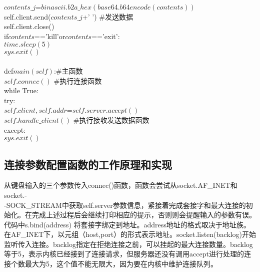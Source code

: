\begin{breakablealgorithm}
\begin{algorithmic}[1]
			\qquad \qquad $contents\_j$=$binascii.b2a\_hex(base64.b64encode(contents)) $\\			\qquad \qquad self.client.send($contents\_j$+' ') \qquad \#发送数据\\
			\qquad \qquad self.client.close()\\

			\qquad \qquad if\quad  $contents$=='kill'\quad  or\quad  $contents$=='exit':\\
				\qquad \qquad \qquad $time.sleep(5)$\\
				\qquad \qquad \qquad $sys.exit()$\\
\\
\qquad def\quad  $main(self)$:\qquad \#主函数\\
		\qquad \quad  $self.connec()$ \qquad \#执行连接函数\\
		\qquad \quad  while True:\\

			\qquad \qquad  try:\\
			\qquad \qquad \qquad $self.client,self.addr$=$self.server.accept()$\\
			\qquad \qquad \qquad $self.handle\_client()$   \qquad \#执行接收发送数据函数\\
			\qquad \qquad except:\\
				\qquad \qquad \qquad $sys.exit()$
	\end{algorithmic}
\end{breakablealgorithm}
\subsection{连接参数配置函数的工作原理和实现}
从键盘输入的三个参数传入connec()函数，函数会尝试从socket.AF\_INET和socket.-\\-SOCK\_STREAM中获取self.server参数信息，紧接着完成套接字和最大连接的初始化。在完成上述过程后会继续打印相应的提示，否则则会提醒输入的参数有误。代码中s.bind(address) 将套接字绑定到地址\cite{9}。address地址的格式取决于地址族。在AF\_INET下，以元组（host,port）的形式表示地址。socket.listen(backlog)开始监听传入连接。backlog指定在拒绝连接之前，可以挂起的最大连接数量。backlog等于5，表示内核已经接到了连接请求，但服务器还没有调用accept进行处理的连接个数最大为5，这个值不能无限大，因为要在内核中维护连接队列。

